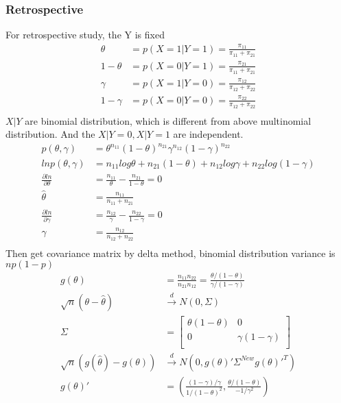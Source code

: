 \documentclass[11pt]{article} %
\begin{document}
	\subsubsection{Retrospective}
	For retrospective study, the Y is fixed
	\begin{align*}
		\theta &= p(X=1|Y=1) = \frac{\pi_{11}}{\pi_{11} + \pi_{21}}\\
		1- \theta &= p(X=0|Y=1) = \frac{\pi_{21}}{\pi_{11} + \pi_{21}}\\
		\gamma &= p(X=1|Y=0) = \frac{\pi_{12}}{\pi_{12} + \pi_{22}}\\
		1- \gamma &= p(X=0|Y=0) = \frac{\pi_{22}}{\pi_{12} + \pi_{22}}\\
	\end{align*} 
	$X|Y$ are binomial distribution, which is different from above multinomial distribution. And the $X|Y=0, X|Y=1$ are independent. \\
	\begin{align*}
		p(\theta, \gamma) &= \theta^{n_{11}} (1-\theta)^{n_{21}} \gamma^{n_{12}} (1-\gamma)^{n_{22}}\\
		ln p(\theta, \gamma) &= n_{11}log\theta + n_{21}(1-\theta) + n_{12}log \gamma + n_{22}log(1-\gamma)\\
		\frac{\partial ln}{\partial \theta} &= \frac{n_{11}}{\theta} - \frac{n_{21}}{1-\theta} = 0\\
		\hat{\theta} &= \frac{n_{11}}{n_{11}+ n_{21}}\\
		\frac{\partial ln}{\partial \gamma} &= \frac{n_{12}}{\gamma} - \frac{n_{22}}{1-\gamma} = 0\\
		\hat{\gamma} &= \frac{n_{12}}{n_{12}+ n_{22}}\\
	\end{align*} 
	Then get covariance matrix by delta method, binomial distribution variance is $np(1-p)$\\
	\begin{align*}
		g(\theta) &= \frac{n_{11}n_{22}}{n_{21}n_{12}} = \frac{\theta/(1-\theta)}{\gamma/(1-\gamma)}\\
		\sqrt{n} \left( \theta - \hat{\theta} \right) & \xrightarrow[]{d} N(0, \Sigma)\\
		\Sigma &= \begin{bmatrix}
			\theta(1-\theta) &  0 \\
			0 &  \gamma(1-\gamma) \\
		\end{bmatrix}\\
		\sqrt{n} \left( g(\hat\theta) - g({\theta}) \right) & \xrightarrow[]{d} N(0, g(\theta)' \Sigma^{New} g(\theta)'^T)\\  
		g(\theta)' &= \left( \frac{(1-\gamma)/\gamma}{1/(1-\theta)^2}, \frac{\theta/(1-\theta)}{-1/\gamma^2} \right)
	\end{align*} 
\end{document}
